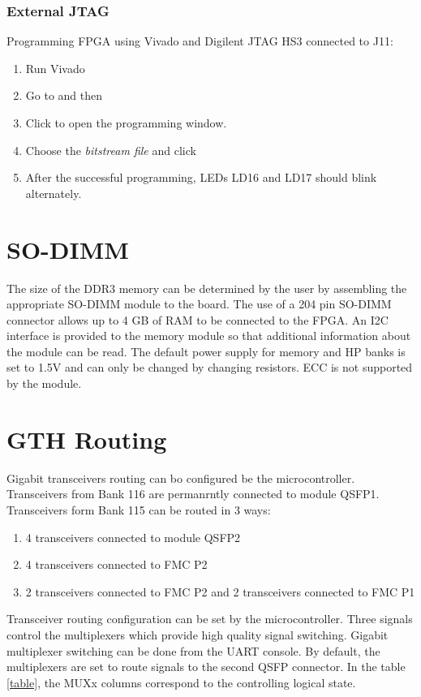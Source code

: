 \documentclass[12pt,oneside,a4]{article}
\begin{document}
\subsubsection{External JTAG}
Programming FPGA using Vivado and Digilent JTAG HS3 connected to J11:
\begin{enumerate}
		\item Run Vivado
		\item Go to  and then  
		\item Click  to open the programming window.
		\item Choose the \textit{bitstream file} and click 

	\item After the successful programming, LEDs LD16 and LD17 should blink alternately.
\end{enumerate}

\section{SO-DIMM}

The size of the DDR3 memory can be determined by the user by assembling the appropriate SO-DIMM module to the board. The use of a 204 pin SO-DIMM connector allows up to 4 GB of RAM to be connected to the FPGA. An I2C interface is provided to the memory module so that additional information about the module can be read. The default power supply for memory and HP banks is set to 1.5V and can only be changed by changing resistors. ECC is not supported by the module.

\section{GTH Routing}
Gigabit transceivers routing can bo configured be the microcontroller. Transceivers from Bank 116 are permanrntly connected to module QSFP1. Transceivers form Bank 115 can be routed in 3 ways:
\begin{enumerate}
    \item 4 transceivers connected to module QSFP2
    \item 4 transceivers connected to FMC P2
    \item 2 transceivers connected to FMC P2 and 2 transceivers connected to FMC P1
\end{enumerate}

Transceiver routing configuration can be set by the microcontroller. Three signals control the multiplexers which provide high quality signal switching. Gigabit multiplexer switching can be done from the UART console. By default, the multiplexers are set to route signals to the second QSFP connector. In the table \ref{table}, the MUXx columns correspond to the controlling logical state.
\end{document}
